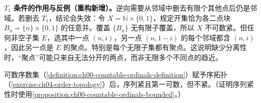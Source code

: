 \documentclass[../../main.tex]{subfiles}%
\begin{document}
\begin{remark}
\textbf{$T_1$ 条件的作用与反例（重构新增）。}逆向需要从邻域中删去有限个其他点后仍是邻域。若删去 $T_1$，结论会失效：令 $X=\mathbb N\times\{0,1\}$，规定开集恰为各二点块 $B_n=\{n\}\times\{0,1\}$ 的任意并。覆盖 $\{B_n\}$ 无有限子覆盖，所以 $X$ 不可数紧。但任何非空子集 $E$，选其中一点 $(n,i)$，另一点 $(n,1-i)$ 的每个邻域都含 $(n,i)$，因此另一点是 $E$ 的聚点。特别是每个无限子集都有聚点。这说明缺少分离性时，“聚点”可能只来自无法分开的两点，而非无限多个不同点的趋近。
\end{remark}
\begin{exercise}\label{exercise:ch04-ordinal-compactness}
可数序数集（\cref{definition:ch00-countable-ordinals-definition}）赋予序拓扑（\cref{exercise:ch04-order-topology}）后，序列紧且第一可数，但不紧。（证明序列紧性时使用\cref{proposition:ch00-countable-ordinals-bounded}。）
\end{exercise}
\end{document}
